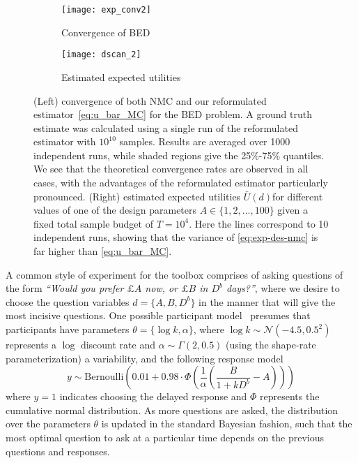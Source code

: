 \begin{figure}[t]
	\centering
	\begin{subfigure}[b]{0.49\textwidth}
		\centering
		\texttt{[image: exp\_conv2]}
		\caption{Convergence of BED\label{fig:exp-conv}}
	\end{subfigure}
		\begin{subfigure}[b]{0.49\textwidth}
			\centering
			\texttt{[image: dscan\_2]}
			\caption{Estimated expected utilities \label{fig:exp-d-scan}}
		\end{subfigure}
	\caption{(Left) convergence of both NMC and our reformulated
		estimator~\eqref{eq:u_bar_MC} for the BED problem.
		A ground truth estimate was calculated using a single run of the reformulated
		estimator with $10^{10}$ samples.
		Results are averaged over 1000 independent runs, while shaded regions give the 25\%-75\% quantiles. We
		see that the theoretical convergence rates are observed in all cases,
		with the advantages of the reformulated estimator particularly pronounced.
		(Right) estimated expected utilities $\bar{U}(d)$for 
		different values of one of the design parameters $A \in \{1,2,\dots,100\}$ given a fixed total
		sample budget of $T=10^4$.  Here the lines correspond to 10 independent runs, showing
		that the variance of \eqref{eq:exp-des-nmc} is far higher than \eqref{eq:u_bar_MC}.
		}
\end{figure}

A common style of experiment for the toolbox comprises of asking questions of the form 
\emph{``Would you prefer $\pounds A$ now, or $\pounds B$ in $D^b$ days?''}, where we desire
to choose the question  variables $d = \{A,B,D^b\}$ in the manner that will give the most 
incisive questions.  One possible participant model~\citep{vincent2016hierarchical}
presumes that participants have parameters $\theta=\{\log k,\alpha\}$, where $\log k \sim \mathcal{N}(-4.5,0.5^2)$ 
represents a $\log$ discount rate and $\alpha\sim \Gamma(2,0.5)$ (using the shape-rate parameterization) a variability, and the following response model
\begin{equation}
\label{eq:design:darc}
y \sim \mathrm{Bernoulli} \left(0.01 + 0.98 \cdot \Phi\left(\frac{1}{\alpha} \left(\frac{B}{1+k D^b}-A\right)\right)\right)
\end{equation}
where $y=1$ indicates choosing the delayed response and $\Phi$ represents the 
cumulative normal distribution. As more questions are asked, the distribution 
over the parameters $\theta$ is updated in the standard Bayesian fashion, such
that the most optimal question to ask at a particular time depends on the previous questions
and responses.  

